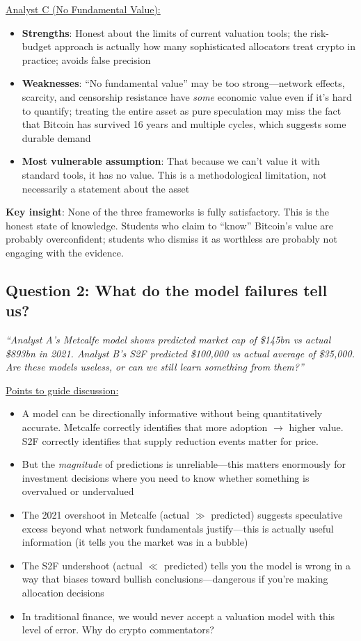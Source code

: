 \documentclass[11pt]{article}
\begin{document}
\medskip
\noindent\underline{Analyst C (No Fundamental Value):}
\begin{itemize}[leftmargin=*]
\item \textbf{Strengths}: Honest about the limits of current valuation tools; the risk-budget approach is actually how many sophisticated allocators treat crypto in practice; avoids false precision
\item \textbf{Weaknesses}: ``No fundamental value'' may be too strong---network effects, scarcity, and censorship resistance have \textit{some} economic value even if it's hard to quantify; treating the entire asset as pure speculation may miss the fact that Bitcoin has survived 16 years and multiple cycles, which suggests some durable demand
\item \textbf{Most vulnerable assumption}: That because we can't value it with standard tools, it has no value. This is a methodological limitation, not necessarily a statement about the asset
\end{itemize}

\medskip
\noindent\textbf{Key insight}: None of the three frameworks is fully satisfactory. This is the honest state of knowledge. Students who claim to ``know'' Bitcoin's value are probably overconfident; students who dismiss it as worthless are probably not engaging with the evidence.

\subsection*{Question 2: What do the model failures tell us?}

\textit{``Analyst A's Metcalfe model shows predicted market cap of \$145bn vs actual \$893bn in 2021. Analyst B's S2F predicted \$100,000 vs actual average of \$35,000. Are these models useless, or can we still learn something from them?''}

\medskip
\noindent\underline{Points to guide discussion:}
\begin{itemize}[leftmargin=*]
\item A model can be directionally informative without being quantitatively accurate. Metcalfe correctly identifies that more adoption $\to$ higher value. S2F correctly identifies that supply reduction events matter for price.
\item But the \textit{magnitude} of predictions is unreliable---this matters enormously for investment decisions where you need to know whether something is overvalued or undervalued
\item The 2021 overshoot in Metcalfe (actual $\gg$ predicted) suggests speculative excess beyond what network fundamentals justify---this is actually useful information (it tells you the market was in a bubble)
\item The S2F undershoot (actual $\ll$ predicted) tells you the model is wrong in a way that biases toward bullish conclusions---dangerous if you're making allocation decisions
\item In traditional finance, we would never accept a valuation model with this level of error. Why do crypto commentators?
\end{itemize}
\end{document}
